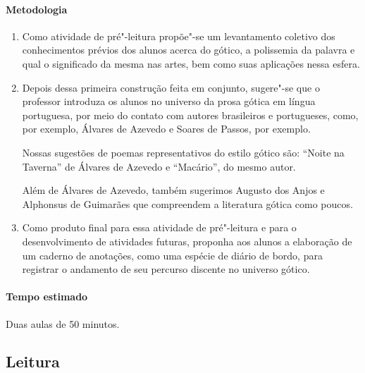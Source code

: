 \documentclass[12pt]{extarticle}
\begin{document}
\paragraph{Metodologia}

\begin{enumerate}
\item
Como atividade de pré"-leitura propõe"-se um levantamento coletivo dos
conhecimentos prévios dos alunos acerca do gótico, a polissemia da palavra e qual o
significado da mesma nas artes, bem como suas aplicações nessa esfera.

\item
Depois dessa primeira construção feita em conjunto, sugere"-se que o professor introduza 
os alunos no universo da prosa gótica em língua portuguesa, por meio do contato com
autores brasileiros e portugueses, como, por exemplo, Álvares de Azevedo
e Soares de Passos, por exemplo. 

Nossas sugestões de poemas representativos do estilo gótico são: ``Noite na Taverna'' 
de Álvares de Azevedo e ``Macário'', do mesmo autor.

Além de Álvares de Azevedo, também sugerimos Augusto dos Anjos e
Alphonsus de Guimarães que compreendem a literatura gótica como poucos.




\item
Como produto final para essa atividade de pré"-leitura e para o desenvolvimento de atividades 
futuras, proponha aos alunos a elaboração de um caderno de anotações, como uma espécie de diário de bordo, 
para registrar o andamento de seu percurso discente no universo gótico.

\end{enumerate}

\paragraph{Tempo estimado} Duas aulas de 50 minutos. 

\subsection{Leitura}  
\end{document}
